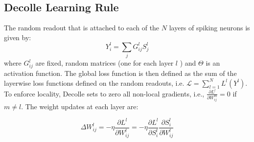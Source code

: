 \documentclass[12pt]{report}
\begin{document}
\subsection{Decolle Learning Rule}
The random readout that is attached to each of the $N$ layers of spiking neurons is given by:
\begin{equation}
Y_{i}^{l}=\sum_{j} G_{i j}^{l} S_{j}^{l}
\end{equation}
where $G_{i j}^{l}$ are fixed, random matrices (one for each layer $l$ ) and $\Theta$ is an activation function. The global loss function is then defined as the sum of the layerwise loss functions defined on the random readouts, i.e. $\mathcal{L}=\sum_{l=1}^{N} L^{l}\left(Y^{l}\right)$. To enforce locality, Decolle sets to zero all non-local gradients, i.e., $\frac{\partial L^{l}}{\partial W_{i j}^{m}}=0$ if $m \neq l$. The weight updates at each layer are:

\begin{equation}
\Delta W_{i j}^{l}=-\eta \frac{\partial L^{l}}{\partial W_{i j}^{l}}=-\eta \frac{\partial L^{l}}{\partial S_{i}^{l}} \frac{\partial S_{i}^{l}}{\partial W_{i j}^{l}}
\end{equation}
\end{document}
